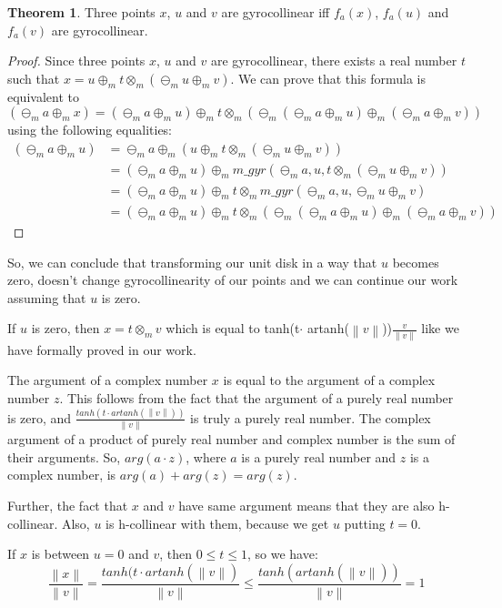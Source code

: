 \documentclass[a4paper]{article}
\theoremstyle{definition}
\newtheorem{theorem}{Theorem}[section]
\newcommand{\norm}[1]{\left\lVert#1\right\rVert}
\begin{document}
\begin{theorem}
Three points $x$, $u$ and $v$ are gyrocollinear iff $f_a(x)$, $f_a(u)$ and $f_a(v)$ are gyrocollinear.
\end{theorem}
\begin{proof} Since three points $x$, $u$ and $v$ are gyrocollinear, there exists a real number $t$ such that $x=u\oplus_m t\otimes_m (\ominus_m u \oplus_m v)$. We can prove that this formula is equivalent to $$(\ominus_m a \oplus_m x) = (\ominus_m a \oplus_m u) \oplus_m t \otimes_m (\ominus_m (\ominus_m a \oplus_m u) \oplus_m (\ominus_m a \oplus_m v))$$
using the following equalities:
\begin{align*} 
(\ominus_m a \oplus_m u) &=  \ominus_m a \oplus_m (u\oplus_m t \otimes_m (\ominus_m u \oplus_m v)) \\ 
 &=  (\ominus_m a \oplus_m u) \oplus_m m\_gyr (\ominus_m a, u, t\otimes_m (\ominus_m u \oplus_m v))\\
 &= (\ominus_m a \oplus_m u) \oplus_m t \otimes_m m\_gyr(\ominus_m a, u, \ominus_m u \oplus_m v)\\
 &= (\ominus_m a \oplus_m u) \oplus_m t \otimes_m (\ominus_m (\ominus_m a \oplus_m u) \oplus_m (\ominus_m a \oplus_m v))
\end{align*}
\end{proof}

So, we can conclude that transforming our unit disk in a way that $u$ becomes zero, doesn't change gyrocollinearity of our points and we can continue our work assuming that $u$ is zero.

If $u$ is zero, then $x=t\otimes_m v$ which is equal to tanh(t$\cdot$ artanh($\norm{v}$))$\frac{v}{\norm{v}}$ like we have formally proved in our work. 

The argument of a complex number $x$ is equal to the argument of a complex number $z$. This follows from the fact that the argument of a purely real number is zero, and $\frac{tanh(t\cdot artanh(\norm{v}))}{\norm{v}}$ is truly a purely real number. The complex argument of a product of purely real number and complex number is the sum of their arguments. So, $arg(a\cdot z)$, where $a$ is a purely real number and $z$ is a complex number, is $arg(a)+arg(z) = arg(z)$.  

Further, the fact that $x$ and $v$ have same argument means that they are also h-collinear. Also, $u$ is h-collinear with them, because we get $u$ putting $t=0$.

If $x$ is between $u=0$ and $v$, then $0\leq t \leq 1$, so we have:
$$\frac{\norm{x}}{\norm{v}} = \frac{tanh(t\cdot artanh(\norm{v})}{\norm{v}}\leq \frac{tanh(artanh(\norm{v}))}{\norm{v}}=1$$
\end{document}

